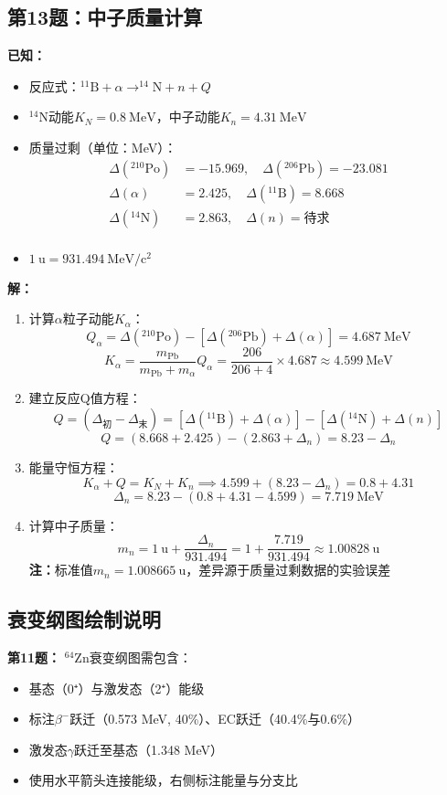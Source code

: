 \documentclass{article}
\begin{document}
\subsection*{第13题：中子质量计算}
\textbf{已知：}
\begin{itemize}
  \item 反应式：$^{11}\mathrm{B} + \alpha \rightarrow ^{14}\mathrm{N} + n + Q$
  \item $^{14}\mathrm{N}$动能$K_N = 0.8\ \mathrm{MeV}$，中子动能$K_n = 4.31\ \mathrm{MeV}$
  \item 质量过剩（单位：MeV）：
  $$
  \begin{aligned}
    \Delta(^{210}\mathrm{Po}) &= -15.969, \quad \Delta(^{206}\mathrm{Pb}) = -23.081 \\
    \Delta(\alpha) &= 2.425, \quad \Delta(^{11}\mathrm{B}) = 8.668 \\
    \Delta(^{14}\mathrm{N}) &= 2.863, \quad \Delta(n) = \text{待求} \\
  \end{aligned}
  $$
  \item $1\ \mathrm{u} = 931.494\ \mathrm{MeV/c^2}$
\end{itemize}

\textbf{解：}
\begin{enumerate}
  \item 计算$\alpha$粒子动能$K_\alpha$：
  $$
  Q_\alpha = \Delta(^{210}\mathrm{Po}) - [\Delta(^{206}\mathrm{Pb}) + \Delta(\alpha)] = 4.687\ \mathrm{MeV}
  $$
  $$
  K_\alpha = \frac{m_{\mathrm{Pb}}}{m_{\mathrm{Pb}} + m_\alpha} Q_\alpha = \frac{206}{206+4} \times 4.687 \approx 4.599\ \mathrm{MeV}
  $$
  
  \item 建立反应Q值方程：
  $$
  Q = (\Delta_{\mathrm{初}} - \Delta_{\mathrm{末}}) = [\Delta(^{11}\mathrm{B}) + \Delta(\alpha)] - [\Delta(^{14}\mathrm{N}) + \Delta(n)]
  $$
  $$
  Q = (8.668 + 2.425) - (2.863 + \Delta_n) = 8.23 - \Delta_n
  $$
  
  \item 能量守恒方程：
  $$
  K_\alpha + Q = K_N + K_n \implies 4.599 + (8.23 - \Delta_n) = 0.8 + 4.31
  $$
  $$
  \Delta_n = 8.23 - (0.8 + 4.31 - 4.599) = 7.719\ \mathrm{MeV}
  $$
  
  \item 计算中子质量：
  $$
  m_n = 1\ \mathrm{u} + \frac{\Delta_n}{931.494} = 1 + \frac{7.719}{931.494} \approx 1.00828\ \mathrm{u}
  $$
  \textbf{注：}标准值$m_n = 1.008665\ \mathrm{u}$，差异源于质量过剩数据的实验误差
\end{enumerate}

\subsection*{衰变纲图绘制说明}
\textbf{第11题：} $^{64}\mathrm{Zn}$衰变纲图需包含：
\begin{itemize}
  \item 基态（0⁺）与激发态（2⁺）能级
  \item 标注$\beta^-$跃迁（0.573 MeV, 40\%）、EC跃迁（40.4\%与0.6\%）
  \item 激发态$\gamma$跃迁至基态（1.348 MeV）
  \item 使用水平箭头连接能级，右侧标注能量与分支比
\end{itemize}
\end{document}
